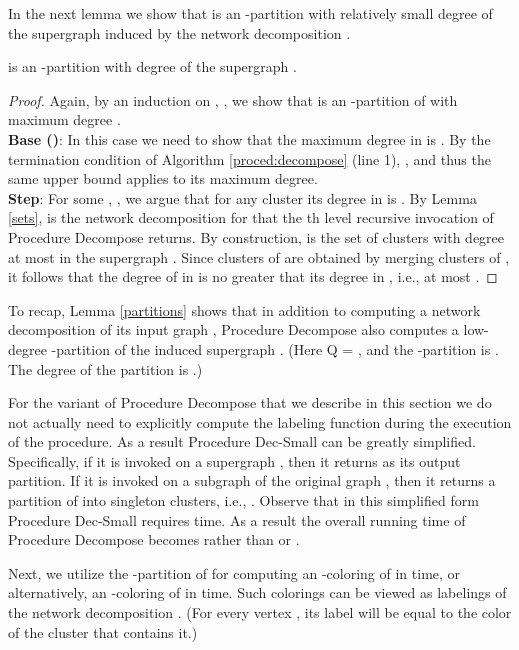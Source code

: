 \documentclass[11pt]{article}
\begin{document}
In the next lemma we show that  is an -partition with relatively small degree of the supergraph  induced by the network decomposition .
\begin{lem} \label{partitions}
 is an -partition with degree  of the supergraph .
\end{lem}
\begin{proof}
Again, by an induction on , , we show that  is an -partition of  with maximum degree .\\
{\bf Base ()}: In this case we need to show that the maximum degree in  is . By the termination condition of Algorithm \ref{proced:decompose} (line 1), , and thus the same upper bound applies to its maximum degree.\\
{\bf Step}: For some , , we argue that for any cluster  its degree in  is . By Lemma \ref{sets},  is the network decomposition for  that the th level recursive invocation of Procedure Decompose returns. By construction,  is the set of clusters with degree at most  in the supergraph . Since clusters of  are obtained by merging clusters of , it follows that the degree of  in  is no greater that its degree in , i.e., at most .
\end{proof}
To recap, Lemma \ref{partitions} shows that in addition to computing a network decomposition  of its input graph , Procedure Decompose also computes a low-degree -partition of the induced supergraph . (Here Q = , and the -partition is . The degree of the partition is .)

For the variant of Procedure Decompose that we describe in this section we do not actually need to explicitly compute the labeling function during the execution of the procedure. As a result Procedure Dec-Small can be greatly simplified. Specifically, if it is invoked on a supergraph , then it returns  as its output partition. If it is invoked on a subgraph  of the original graph , then it returns a partition of  into singleton clusters, i.e., . Observe that in this simplified form Procedure Dec-Small requires  time. As a result the overall running time of Procedure Decompose becomes  rather than  or .

Next, we utilize the -partition  of  for computing an -coloring of  in  time, or alternatively, an -coloring of  in  time. Such colorings can be viewed as labelings of the network decomposition . (For every vertex , its label will be equal to the color of the cluster  that contains it.)
\end{document}
